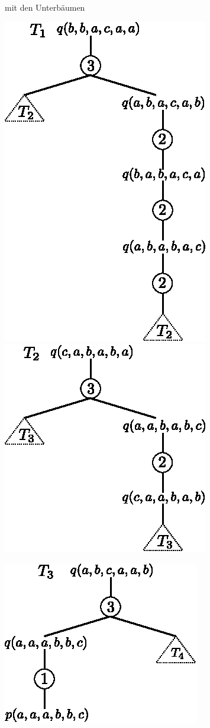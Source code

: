 \documentclass[12pt,a4paper]{amsart}
\begin{document}
\begin{aufgabe1}
\begin{center}
\end{center}
mit den Unterbäumen
\begin{center}
\includegraphics[]{t1.eps} 
\includegraphics[]{t2.eps}
\end{center}
\begin{center}
\includegraphics[]{t3.eps}

\end{center}
\end{aufgabe1}
\end{document}
